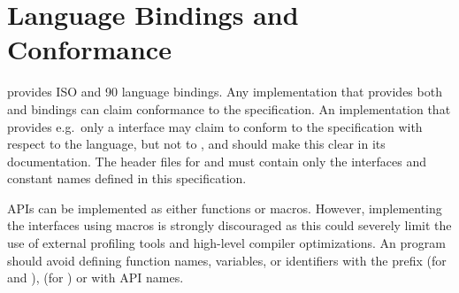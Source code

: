 \section{Language Bindings and Conformance}


\openshmem provides ISO \Clang{} and \Fortran{} 90 language bindings. Any implementation that provides both \Clang{} and \Fortran{} bindings can claim conformance to the specification. An implementation that provides e.g.\ only a \Clang{} interface may claim to conform to the \openshmem specification with respect to
the \Clang{} language, but not to \Fortran{}, and should make this clear in its documentation. The \openshmem header files for \Clang{} and \Fortran{} must contain only the interfaces and constant names defined in this specification.

\openshmem{} \ac{API}s can be implemented as either functions or macros. However, implementing the interfaces using macros is strongly discouraged as this could severely limit the use of external profiling tools and high-level compiler optimizations. An \openshmem{} program should avoid defining function names, variables, or
identifiers with the prefix \shmemprefix{} (for \Clang{} and \Fortran{}), \shmemprefixC{} (for \Clang{}) or with \openshmem \ac{API} names.


 
%

